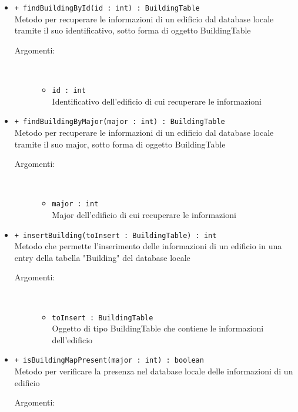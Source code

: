 \documentclass[../DefinizioneDiProdotto.tex]{subfiles}
\begin{document}
\begin{description}
\begin{itemize}
 \item \texttt{+ findBuildingById(id : int) : BuildingTable}\\
Metodo per recuperare le informazioni di un edificio dal database locale tramite il suo identificativo, sotto forma di oggetto BuildingTable
 \begin{description}
\item[Argomenti:] \
\begin{itemize}
\item \texttt{id : int}\\
Identificativo dell'edificio di cui recuperare le informazioni\end{itemize}
\end{description}
\item \texttt{+ findBuildingByMajor(major : int) : BuildingTable}\\
Metodo per recuperare le informazioni di un edificio dal database locale tramite il suo major, sotto forma di oggetto BuildingTable
 \begin{description}
\item[Argomenti:] \
\begin{itemize}
\item \texttt{major : int}\\
Major dell'edificio di cui recuperare le informazioni\end{itemize}
\end{description}
\item \texttt{+ insertBuilding(toInsert : BuildingTable) : int}\\
Metodo che permette l'inserimento delle informazioni di un edificio in una entry della tabella "Building" del database locale
 \begin{description}
\item[Argomenti:] \
\begin{itemize}
\item \texttt{toInsert : BuildingTable}\\
Oggetto di tipo BuildingTable che contiene le informazioni dell'edificio\end{itemize}
\end{description}
\item \texttt{+ isBuildingMapPresent(major : int) : boolean}\\
Metodo per verificare la presenza nel database locale delle informazioni di un edificio
 \begin{description}
\item[Argomenti:] \
\begin{itemize}

\end{itemize}
\end{description}
\end{itemize}
\end{description}
\end{document}
